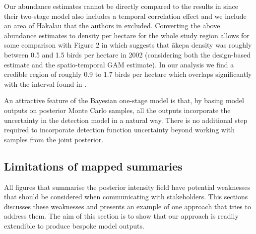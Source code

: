 \documentclass{statsoc}
\newcommand{\akepa}{\textquotesingle\={a}kepa}  %
\begin{document}
Our abundance estimates cannot be directly compared to the results in \cite{camp_dsm_2020} since their two-stage model also includes a temporal correlation effect and we include an area of Hakalau that the authors in \cite{camp_dsm_2020} excluded.  Converting the above abundance estimates to density per hectare for the whole study region allows for some comparison with Figure 2 in \cite{camp_dsm_2020} which suggests that \akepa{} density was roughly between 0.5 and 1.5 birds per hectare in 2002 (considering both the design-based estimate and the spatio-temporal GAM estimate).  In our analysis we find a credible region of roughly 0.9 to 1.7 birds per hectare which overlaps significantly with the interval found in \cite{camp_dsm_2020}.

An attractive feature of the Bayesian one-stage model is that, by basing model outputs on posterior Monte Carlo samples, all the outputs incorporate the uncertainty in the detection model in a natural way.  There is no additional step required to incorporate detection function uncertainty beyond working with samples from the joint posterior.

\subsection{Limitations of mapped summaries}

All figures that summarise the posterior intensity field have potential weaknesses that should be considered when communicating with stakeholders.  This sections discusses these weaknesses and presents an example of one approach that tries to address them.  The aim of this section is to show that our approach is readily extendible to produce bespoke model outputs.
\end{document}
